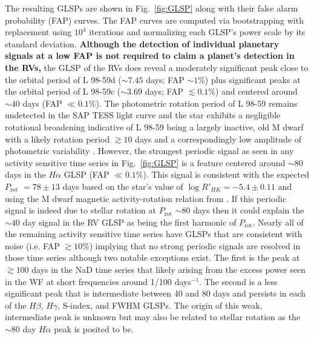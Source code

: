 \documentclass[longauth]{aa}
\newcommand{\prot}{$P_{\text{rot}}$}
\begin{document}
The resulting GLSPs are shown in Fig.~\ref{fig:GLSP} along with their false alarm probability (FAP) curves. The FAP curves are computed via bootstrapping with replacement using $10^4$ iterations and normalizing each GLSP's power scale by its standard deviation. \textbf{Although the detection of individual planetary signals at a low FAP is not required to claim a planet's detection in the RVs,} the GLSP of the RVs does reveal a moderately significant peak close to the orbital period of L 98-59d ($\sim 7.45$ days; FAP $\sim 1$\%) plus significant peaks at the orbital period of L 98-59c ($\sim 3.69$ days; FAP $\lesssim 0.1$\%) and centered around $\sim 40$ days (FAP $\ll 0.1$\%). The photometric rotation period of L 98-59 remains undetected in the SAP TESS light curve and the star exhibits a negligible rotational broadening  indicative of L 98-59 being a largely inactive, old M dwarf with a likely rotation period $\gtrsim 10$ days and a correspondingly low amplitude of photometric variability \citep{newton16a}. However, the strongest periodic signal as seen in any activity sensitive time series in Fig.~\ref{fig:GLSP} is a feature centered around $\sim 80$ days in the $H\alpha$ GLSP (FAP $\ll 0.1$\%). This signal is consistent with the expected \prot{} $=78\pm 13$ days based on the star's value of $\log{R'_{HK}}=-5.4\pm 0.11$ and using the M dwarf magnetic activity-rotation relation from \cite{astudillodefru17b}. If this periodic signal is indeed due to stellar rotation at \prot{} $\sim 80$ days then it could explain the $\sim 40$ day signal in the RV GLSP as being the first harmonic of \prot{.} Nearly all of the remaining activity sensitive time series have GLSPs that are consistent with noise (i.e. FAP $\gtrsim 10$\%) implying that no strong periodic signals are resolved in those time series although two notable exceptions exist. The first is the peak at $\gtrsim 100$ days in the NaD time series that likely arising from the excess power seen in the WF at short frequencies around 1/100 days$^{-1}$. The second is a less significant peak that is intermediate between 40 and 80 days and persists in each of the $H\beta$, $H\gamma$, S-index, and FWHM GLSPs. The origin of this weak, intermediate peak is unknown but may also be related to stellar rotation as the $\sim 80$ day $H\alpha$ peak is posited to be.
\end{document}
